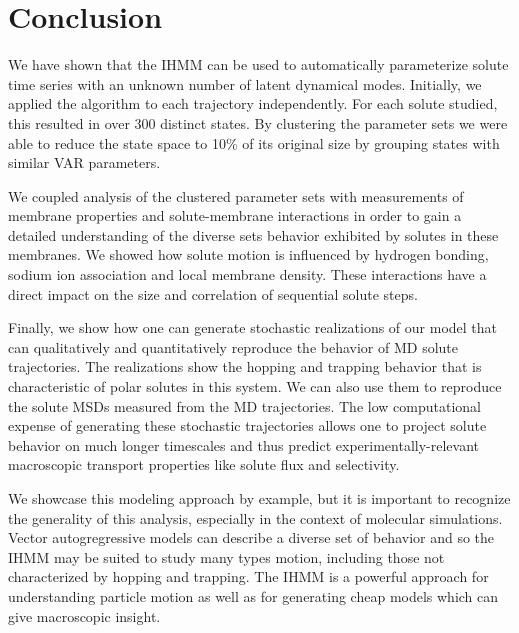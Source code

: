 \documentclass[journal=jpcbfk,manuscript=article]{achemso}
\begin{document}
  
  \section{Conclusion}
  
  We have shown that the IHMM can be used to automatically parameterize solute 
  time series with an unknown number of latent dynamical modes. Initially, we applied
  the algorithm to each trajectory independently. For each solute studied, this resulted
  in over 300 distinct states. By clustering the parameter sets we were able to reduce 
  the state space to 10\% of its original size by grouping states with similar VAR
  parameters.
  
  We coupled analysis of the clustered parameter sets with measurements of membrane 
  properties and solute-membrane interactions in order to gain a detailed understanding
  of the diverse sets behavior exhibited by solutes in these membranes. We showed how
  solute motion is influenced by hydrogen bonding, sodium ion association and local
  membrane density. These interactions have a direct impact on the size and
  correlation of sequential solute steps.
  
  Finally, we show how one can generate stochastic realizations of our model that
  can qualitatively and quantitatively reproduce the behavior of MD solute 
  trajectories. The realizations show the hopping and trapping behavior that is
  characteristic of polar solutes in this system. We can also use them to reproduce
  the solute MSDs measured from the MD trajectories. The low computational expense 
  of generating these stochastic trajectories allows one to project solute behavior
  on much longer timescales and thus predict experimentally-relevant macroscopic 
  transport properties like solute flux and selectivity.
  
  We showcase this modeling approach by example, but it is important to
  recognize the generality of this analysis, especially in the context of molecular
  simulations. Vector autogregressive models can describe a diverse set of behavior
  and so the IHMM may be suited to study many types motion, including those not 
  characterized by hopping and trapping. The IHMM is a powerful approach for 
  understanding particle motion as well as for generating cheap models
  which can give macroscopic insight.
  
\end{document}
